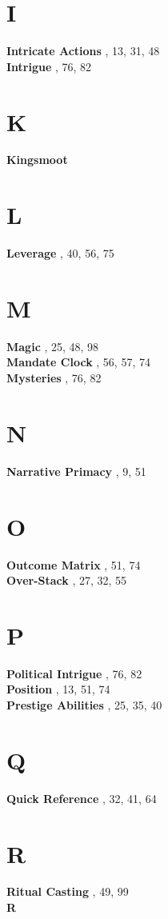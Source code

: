 \section*{I}
\textbf{Intricate Actions} , 13, 31, 48\\
\textbf{Intrigue} , 76, 82\\

\section*{K}
\textbf{Kingsmoot} \\

\section*{L}
\textbf{Leverage} , 40, 56, 75\\

\section*{M}
\textbf{Magic} , 25, 48, 98\\
\textbf{Mandate Clock} , 56, 57, 74\\
\textbf{Mysteries} , 76, 82\\

\section*{N}
\textbf{Narrative Primacy} , 9, 51\\

\section*{O}
\textbf{Outcome Matrix} , 51, 74\\
\textbf{Over-Stack} , 27, 32, 55\\

\section*{P}
\textbf{Political Intrigue} , 76, 82\\
\textbf{Position} , 13, 51, 74\\
\textbf{Prestige Abilities} , 25, 35, 40\\

\section*{Q}
\textbf{Quick Reference} , 32, 41, 64\\

\section*{R}
\textbf{Ritual Casting} , 49, 99\\
\textbf{R}
